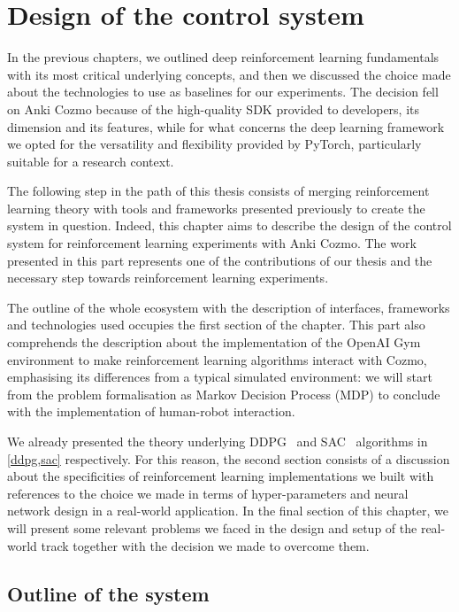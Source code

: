 \chapter{Design of the control system}\label{ch:ch4}

In the previous chapters, we outlined deep reinforcement learning fundamentals with its most critical underlying concepts, and then we discussed the choice made about the technologies to use as baselines for our experiments.
The decision fell on Anki Cozmo because of the high-quality SDK provided to developers, its dimension and its features, while for what concerns the deep learning framework we opted for the versatility and flexibility provided by PyTorch, particularly suitable for a research context.

The following step in the path of this thesis consists of merging reinforcement learning theory with tools and frameworks presented previously to create the system in question.
Indeed, this chapter aims to describe the design of the control system for reinforcement learning experiments with Anki Cozmo.
The work presented in this part represents one of the contributions of our thesis and the necessary step towards reinforcement learning experiments.

The outline of the whole ecosystem with the description of interfaces, frameworks and technologies used occupies the first section of the chapter.
This part also comprehends the description about the implementation of the OpenAI Gym environment to make reinforcement learning algorithms interact with Cozmo, emphasising its differences from a typical simulated environment: we will start from the problem formalisation as Markov Decision Process (MDP) to conclude with the implementation of human-robot interaction.

We already presented the theory underlying DDPG~\cite{lillicrap2015continuous} and SAC~\cite{haarnoja2018soft, haarnoja2018alg} algorithms in \vref{ddpg,sac} respectively.
For this reason, the second section consists of a discussion about the specificities of reinforcement learning implementations we built with references to the choice we made in terms of hyper-parameters and neural network design in a real-world application.
In the final section of this chapter, we will present some relevant problems we faced in the design and setup of the real-world track together with the decision we made to overcome them.

\section{Outline of the system}\label{sec:outline-of-the-system}

